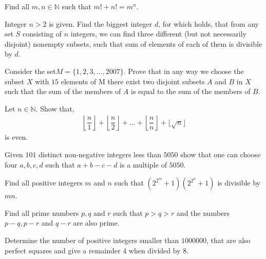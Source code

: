 \documentclass[problems.tex]{subfile}
\begin{document}
	\begin{problem}[Belarus $2009$]
		Find all $m,n\in\mathbb{N}$ such that $m!+n!=m^n$.
	\end{problem}
	
	\begin{problem}
		Integer $n>2$ is given. Find the biggest integer $d$, for which holds, that from any set $S$ consisting of $n$ integers, we can find three different (but not necessarily disjoint) nonempty subsets, such that sum of elements of each of them is divisible by $d$.
	\end{problem}
	
	\begin{problem}
		Consider the set$ M = \{1, 2, 3, . . . , 2007\}$. Prove that in any way we choose the subset $X$ with $15$ elements of M there exist two disjoint subsets         $A$ and $B$ in $X$ such that the sum of the members of $A$ is equal to the sum of the members of $B$.
	\end{problem}
	
	\begin{problem}[India $2014$]
		Let $n\in\mathbb{N}$. Show that,	
			\begin{align*}
				\left\lfloor\dfrac{n}{1}\right\rfloor+\left\lfloor\dfrac{n}{2}\right\rfloor+\ldots+\left\lfloor\dfrac{n}{n}\right\rfloor+
				\lfloor\sqrt{n}\rfloor
			\end{align*}
		is even.
	\end{problem}
	
	\begin{problem}
		Given $101$ distinct non-negative integers less than $5050$ show that one can choose four $a, b, c, d$ such that $a + b - c - d$ is a multiple of $5050$.
	\end{problem}
	
	\begin{problem}
		Find all positive integers $m$ and $n$ such that $\left(2^{2^m}+1\right)\left(2^{2^n}+1\right)$ is divisible by $mn$.
	\end{problem}
	
	\begin{problem}[Slovenia $2010$]
		Find all prime numbers $p, q$ and $r$ such that $p > q > r$ and the numbers $p-q,p-r$ and $q-r$ are also prime.
	\end{problem}
	
	\begin{problem}
		Determine the number of positive integers smaller than $1000000$, that are also perfect squares and give a remainder $4$ when divided by $8$.
	\end{problem}
	
\end{document}
